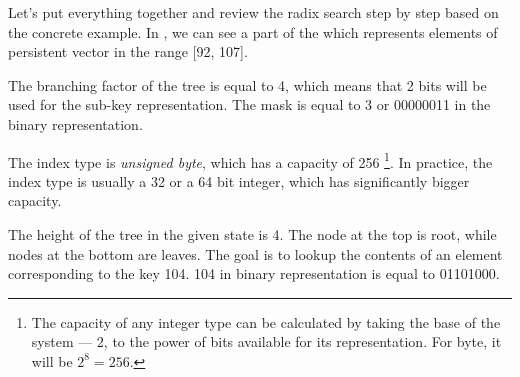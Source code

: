 \begin{figure}
\end{figure}

Let's put everything together and review the radix search step by step based on the concrete example. In , we can see a part of the \rbtree{} which represents elements of persistent vector in the range [92, 107].

The branching factor of the tree is equal to 4, which means that 2 bits will be used for the sub-key representation. The mask is equal to 3 or 00000011 in the binary representation.

The index type is \emph{unsigned byte}, which has a capacity of 256 \footnote{The capacity of any integer type can be calculated by taking the base of the system --- 2, to the power of bits available for its representation. For byte, it will be $2^8 = 256$.}. In practice, the index type is usually a 32 or a 64 bit integer, which has significantly bigger capacity.

The height of the tree in the given state is 4. The node at the top is root, while nodes at the bottom are leaves. The goal is to lookup the contents of an element corresponding to the key 104. 104 in binary representation is equal to 01101000.

